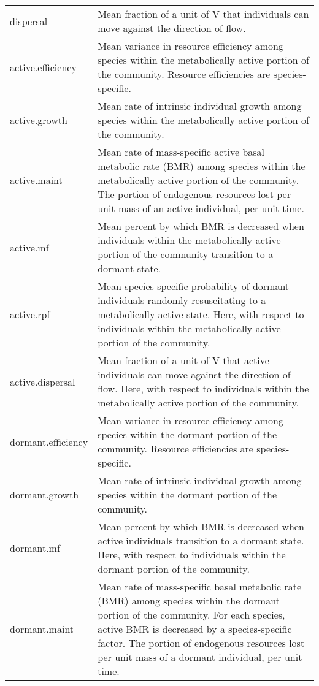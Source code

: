 \documentclass[12pt]{article}
\begin{document}
\begin{longtable}{| p{} | p{} |}
dispersal & Mean fraction of a unit of V that individuals can move against the direction of flow. \\[6pt]

active.efficiency & Mean variance in resource efficiency among species within the metabolically active portion of the community. Resource efficiencies are species-specific. \\[6pt]

active.growth & Mean rate of intrinsic individual growth among species within the metabolically active portion of the community. \\[6pt]

active.maint & Mean rate of mass-specific active basal metabolic rate (BMR) among species within the metabolically active portion of the community. The portion of endogenous resources lost per unit mass of an active individual, per unit time. \\[6pt]

active.mf & Mean percent by which BMR is decreased when individuals within the metabolically active portion of the community transition to a dormant state. \\[6pt]

active.rpf & Mean species-specific probability of dormant individuals randomly resuscitating to a metabolically active state. Here, with respect to individuals within the metabolically active portion of the community. \\[6pt]

active.dispersal & Mean fraction of a unit of V that active individuals can move against the direction of flow. Here, with respect to individuals within the metabolically active portion of the community. \\[6pt]

dormant.efficiency & Mean variance in resource efficiency among species within the dormant portion of the community. Resource efficiencies are species-specific. \\[6pt]

dormant.growth & Mean rate of intrinsic individual growth among species within the dormant portion of the community. \\

dormant.mf & Mean percent by which BMR is decreased when active individuals transition to a dormant state. Here, with respect to individuals within the dormant portion of the community. \\[6pt]

dormant.maint & Mean rate of mass-specific basal metabolic rate (BMR) among species within the dormant portion of the community. For each species, active BMR is decreased by a species-specific factor. The portion of endogenous resources lost per unit mass of a dormant individual, per unit time. \\[6pt]


\end{longtable}
\end{document}
